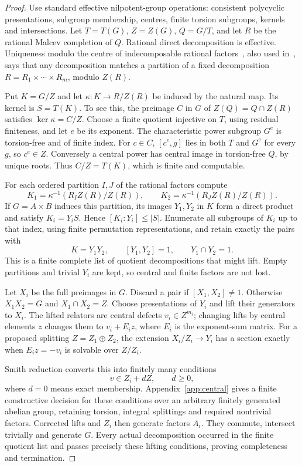 \begin{proof}
Use standard effective nilpotent-group operations: consistent
polycyclic presentations, subgroup membership, centres, finite torsion
subgroups, kernels and intersections. Let $T=T(G)$, $Z=Z(G)$,
$Q=G/T$, and let $R$ be the rational Malcev completion of $Q$.
Rational direct decomposition is effective. Uniqueness modulo the
centre of indecomposable rational factors~\cite[Theorem 3.3]{fgh},
also used in~\cite{bmo}, says that any decomposition matches a partition
of a fixed decomposition $R=R_1\times\cdots\times R_m$, modulo $Z(R)$.

Put $K=G/Z$ and let $\kappa:K\to R/Z(R)$ be induced by the natural
map. Its kernel is $S=T(K)$. To see this, the preimage $C$ in $G$
of $Z(Q)=Q\cap Z(R)$ satisfies $\ker\kappa=C/Z$. Choose a finite
quotient injective on $T$, using residual finiteness, and let $e$ be
its exponent. The characteristic power subgroup $G^e$ is torsion-free
and of finite index. For $c\in C$, $[c^e,g]$ lies in both $T$ and
$G^e$ for every $g$, so $c^e\in Z$. Conversely a central power has
central image in torsion-free $Q$, by unique roots. Thus $C/Z=T(K)$,
which is finite and computable.

For each ordered partition $I,J$ of the rational factors compute
\[
 K_1=\kappa^{-1}(R_I Z(R)/Z(R)),\qquad
 K_2=\kappa^{-1}(R_J Z(R)/Z(R)).
\]
If $G=A\times B$ induces this partition, its images $Y_1,Y_2$ in
$K$ form a direct product and satisfy $K_i=Y_iS$. Hence
$[K_i:Y_i]\le|S|$. Enumerate all subgroups of $K_i$ up to that
index, using finite permutation representations, and retain exactly
the pairs with
\[
 K=Y_1Y_2,\qquad[Y_1,Y_2]=1,\qquad Y_1\cap Y_2=1.
\]
This is a finite complete list of quotient decompositions that might
lift. Empty partitions and trivial $Y_i$ are kept, so central and
finite factors are not lost.

Let $X_i$ be the full preimages in $G$. Discard a pair if
$[X_1,X_2]\ne1$. Otherwise $X_1X_2=G$ and $X_1\cap X_2=Z$.
Choose presentations of $Y_i$ and lift their generators to $X_i$.
The lifted relators are central defects $v_i\in Z^{m_i}$; changing
lifts by central elements $z$ changes them to $v_i+E_i z$, where
$E_i$ is the exponent-sum matrix. For a proposed splitting
$Z=Z_1\oplus Z_2$, the extension $X_i/Z_i\to Y_i$ has a section
exactly when $E_i z=-v_i$ is solvable over $Z/Z_i$.

Smith reduction converts this into finitely many conditions
\begin{equation}\label{eq:central-conditions}
 v\in Z_i+dZ,\qquad d\ge0,
\end{equation}
where $d=0$ means exact membership. Appendix~\ref{app:central}
gives a finite constructive decision for these conditions over an
arbitrary finitely generated abelian group, retaining torsion, integral
splittings and required nontrivial factors. Corrected lifts and $Z_i$
then generate factors $A_i$. They commute, intersect trivially and
generate $G$. Every actual decomposition occurred in the finite
quotient list and passes precisely these lifting conditions, proving
completeness and termination.
\end{proof}


